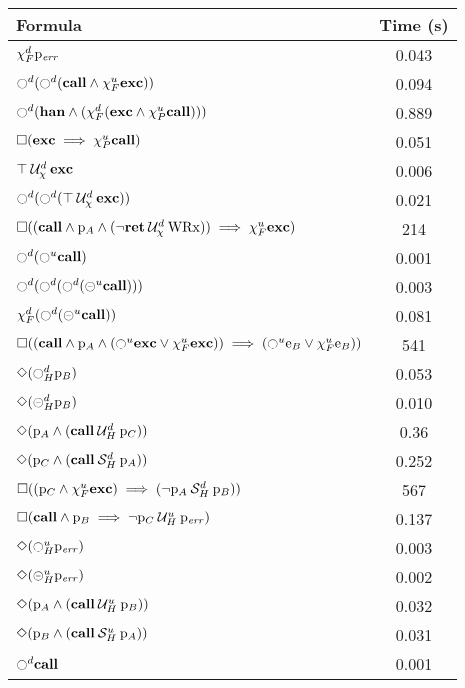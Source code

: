 \documentclass{article}
\begin{document}
\begin{table}
\centering
\begin{tabular}{| l | c |}
\hline
Formula & Time (s) \\
\hline
\hline
$\chi_F^{d} \mathrm{p}_\mathit{err}$ & 0.043 \\
$\ocircle^d (\ocircle^d (\mathbf{call} \land \chi_F^{u} \mathbf{exc}))$ & 0.094 \\
$\ocircle^d (\mathbf{han} \land (\chi_F^{d} (\mathbf{exc} \land \chi_P^{u} \mathbf{call})))$ & 0.889 \\
$\square (\mathbf{exc} \implies \chi_P^{u} \mathbf{call})$ & 0.051 \\
${\top} \mathbin{\mathcal{U}_\chi^d} {\mathbf{exc}}$ & 0.006 \\
$\ocircle^d (\ocircle^d ({\top} \mathbin{\mathcal{U}_\chi^d} {\mathbf{exc}}))$ & 0.021 \\
$\square ((\mathbf{call} \land \mathrm{p}_A \land ({\neg \mathbf{ret}} \mathbin{\mathcal{U}_\chi^d} {\mathrm{WRx}})) \implies \chi_F^{u} \mathbf{exc})$ & 214 \\
$\ocircle^d (\ocircle^u \mathbf{call})$ & 0.001 \\
$\ocircle^d (\ocircle^d (\ocircle^d (\circleddash^u \mathbf{call})))$ & 0.003 \\
$\chi_F^{d} (\ocircle^d (\circleddash^u \mathbf{call}))$ & 0.081 \\
$\square ((\mathbf{call} \land \mathrm{p}_A \land (\ocircle^u \mathbf{exc} \lor \chi_F^{u} \mathbf{exc})) \implies (\ocircle^u \mathrm{e}_B \lor \chi_F^{u} \mathrm{e}_B))$ & 541 \\
$\Diamond (\ocircle_H^{d} \mathrm{p}_B)$ & 0.053 \\
$\Diamond (\circleddash_H^{d} \mathrm{p}_B)$ & 0.010 \\
$\Diamond (\mathrm{p}_A \land ({\mathbf{call}} \mathbin{\mathcal{U}_H^d} {\mathrm{p}_C}))$ & 0.36 \\
$\Diamond (\mathrm{p}_C \land ({\mathbf{call}} \mathbin{\mathcal{S}_H^d} {\mathrm{p}_A}))$ & 0.252 \\
$\square ((\mathrm{p}_C \land \chi_F^{u} \mathbf{exc}) \implies ({\neg \mathrm{p}_A} \mathbin{\mathcal{S}_H^d} {\mathrm{p}_B}))$ & 567 \\
$\square (\mathbf{call} \land \mathrm{p}_B \implies {\neg \mathrm{p}_C} \mathbin{\mathcal{U}_H^u} {\mathrm{p}_\mathit{err}})$ & 0.137 \\
$\Diamond (\ocircle_H^{u} \mathrm{p}_\mathit{err})$ & 0.003 \\
$\Diamond (\circleddash_H^{u} \mathrm{p}_\mathit{err})$ & 0.002 \\
$\Diamond (\mathrm{p}_A \land ({\mathbf{call}} \mathbin{\mathcal{U}_H^u} {\mathrm{p}_B}))$ & 0.032 \\
$\Diamond (\mathrm{p}_B \land ({\mathbf{call}} \mathbin{\mathcal{S}_H^u} {\mathrm{p}_A}))$ & 0.031 \\
$\ocircle^d \mathbf{call}$ & 0.001 \\

\end{tabular}
\end{table}
\end{document}
